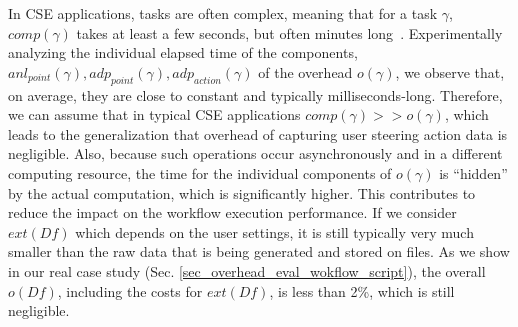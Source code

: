 In CSE applications, tasks are often complex, meaning that for a task $\gamma$, $comp(\gamma)$ takes at least a few
seconds, but often minutes long~\cite{Raicu2008Many-task}.
Experimentally analyzing the individual elapsed time of the components,
$anl_{point}(\gamma), adp_{point}(\gamma), adp_{action}(\gamma)$
of the overhead $o(\gamma)$,
we observe that, on average, they are close to
constant and typically milliseconds-long.
Therefore, we can assume that
in typical CSE applications $comp(\gamma) >> o(\gamma)$, which leads to the generalization that overhead of capturing user steering action data is negligible.
Also,
because such operations occur asynchronously and in a different
computing resource, the time for the individual components of
$o(\gamma)$ is ``hidden'' by the actual computation, which
is significantly higher. This contributes to reduce the impact on the
workflow execution performance.
If we consider $ext(Df)$  which depends on
the user settings, it is still typically very much smaller than the raw
data that is being generated and stored on files. As we show in our real
case study (Sec. \ref{sec_overhead_eval_wokflow_script}), the overall $o(Df)$, including the
costs for $ext(Df)$, is less than 2\%, which is still negligible.


